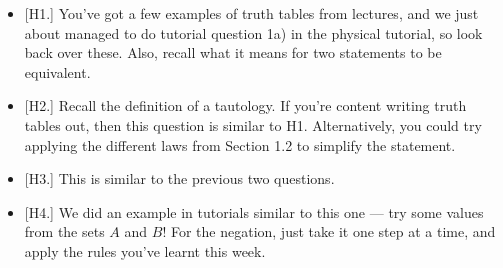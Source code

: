 \documentclass[
  12pt,
  a4paper]{extarticle}
\providecommand{\tightlist}{%
  \setlength{\itemsep}{0pt}\setlength{\parskip}{0pt}}
\theoremstyle{plain}
\theoremstyle{definition}
\theoremstyle{plain}
\theoremstyle{plain}
\theoremstyle{plain}
\theoremstyle{plain}
\theoremstyle{definition}
\theoremstyle{definition}
\newtheorem*{Order Axioms*}{Order Axioms}\newtheorem{Order Axioms}{Order Axioms}[section]
\theoremstyle{remark}
\theoremstyle{remark}
\renewcommand{\;}{\,}
\begin{document}
\begin{itemize}
\tightlist
\item
  {[}H1.{]} You've got a few examples of truth tables from lectures, and we just about managed to do tutorial question 1a) in the physical tutorial, so look back over these. Also, recall what it means for two statements to be equivalent.
\item
  {[}H2.{]} Recall the definition of a tautology. If you're content writing truth tables out, then this question is similar to H1. Alternatively, you could try applying the different laws from Section 1.2 to simplify the statement.
\item
  {[}H3.{]} This is similar to the previous two questions.
\item
  {[}H4.{]} We did an example in tutorials similar to this one --- try some values from the sets \(A\) and \(B\)! For the negation, just take it one step at a time, and apply the rules you've learnt this week.
\end{itemize}
\end{document}
